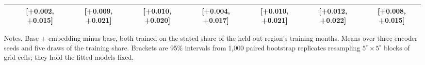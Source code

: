 \begin{table}[!htbp]
{\begin{tabular}{lccccccc}
 & [+0.002, +0.015] & [+0.009, +0.021] & [+0.010, +0.020] & [+0.004, +0.017] & [+0.010, +0.021] & [+0.012, +0.022] & [+0.008, +0.015] \\[2pt]
\hline
\end{tabular}}
\begin{minipage}{0.98\textwidth}\footnotesize\vspace{0.5ex}
Notes. Base + embedding minus base, both trained on the stated share of the held-out region's training months. Means over three encoder seeds and five draws of the training share. Brackets are 95\% intervals from 1,000 paired bootstrap replicates resampling $5^\circ \times 5^\circ$ blocks of grid cells; they hold the fitted models fixed.
\end{minipage}
\end{table}
